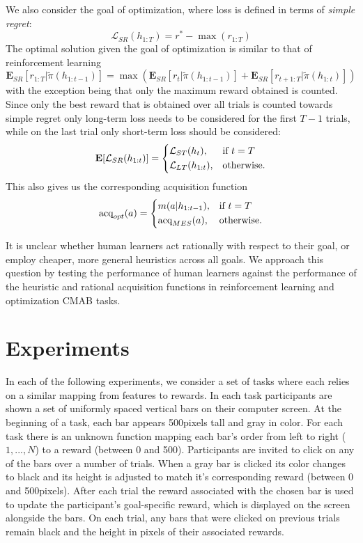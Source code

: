 \documentclass[10pt,letterpaper]{article}
\def\maxheight{500}
\begin{document}
	We also consider the goal of optimization, where loss is defined in terms of \textit{simple regret}:
	$$
	\mathcal{L}_{SR}(h_{1:T}) = r^{*} - \max(r_{1:T})
	$$
	 The optimal solution given the goal of optimization is similar to that of reinforcement learning
	$$
	\mathbf{E}_{SR}[r_{1:T} | \tilde{\pi}( h_{1:t-1})] = \max(\mathbf{E}_{SR}[r_{t} | \tilde{\pi}(h_{1:t-1})] + \mathbf{E}_{SR}[r_{t+1:T} | \tilde{\pi}( h_{1:t})])
	$$
	with the exception being that only the maximum reward obtained is counted. Since only the best reward that is obtained over all trials is counted towards simple regret only long-term loss needs to be considered for the first $T-1$ trials, while on the last trial only short-term loss should be considered:
	\begin{equation*}
	\mathbf{E}[\mathcal{L}_{SR}(h_{1:t})] = 
	\begin{dcases}
	\mathcal{L}_{ST}(h_{t}), & \text{if } t = T\\
	\mathcal{L}_{LT}(h_{1:t}), & \text{otherwise}.
	\end{dcases}
	\end{equation*}
	This also gives us the corresponding acquisition function
	\begin{equation*}
	\text{acq}_{opt}(a) = 
	\begin{dcases}
	m(a|h_{1:t-1}), & \text{if } t = T\\
	\text{acq}_{MES}(a), & \text{otherwise}.
	\end{dcases}
	\end{equation*}
	
	It is unclear whether human learners act rationally with respect to their goal, or employ cheaper, more general heuristics across all goals. We approach this question by testing the performance of human learners against the performance of the heuristic and rational acquisition functions in reinforcement learning and optimization CMAB tasks.
	
	\section{Experiments}
	
	In each of the following experiments, we consider a set of tasks where each relies on a similar mapping from features to rewards. In each task participants are shown a set of uniformly spaced vertical bars on their computer screen. At the beginning of a task, each bar appears \maxheight \space pixels tall and gray in color. For each task there is an unknown function mapping each bar's order from left to right ($1,...,N$) to a reward (between 0 and \maxheight \space). Participants are invited to click on any of the bars over a number of trials. When a gray bar is clicked its color changes to black and its height is adjusted to match it's corresponding reward (between 0 and \maxheight \space pixels). After each trial the reward associated with the chosen bar is used to update the participant's goal-specific reward, which is displayed on the screen alongside the bars. On each trial, any bars that were clicked on previous trials remain black and the height in pixels of their associated rewards.
	
\end{document}

